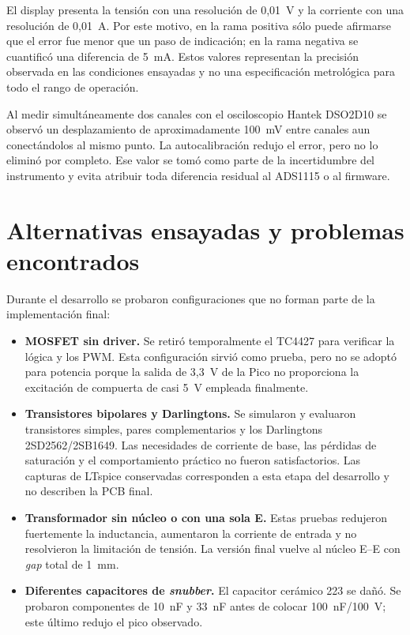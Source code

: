 \documentclass[conference]{IEEEtran}
\begin{document}
El display presenta la tensión con una resolución de 0,01~V y la corriente con una resolución de 0,01~A. Por este motivo, en la rama positiva sólo puede afirmarse que el error fue menor que un paso de indicación; en la rama negativa se cuantificó una diferencia de 5~mA. Estos valores representan la precisión observada en las condiciones ensayadas y no una especificación metrológica para todo el rango de operación.

Al medir simultáneamente dos canales con el osciloscopio Hantek DSO2D10 se observó un desplazamiento de aproximadamente 100~mV entre canales aun conectándolos al mismo punto. La autocalibración redujo el error, pero no lo eliminó por completo. Ese valor se tomó como parte de la incertidumbre del instrumento y evita atribuir toda diferencia residual al ADS1115 o al firmware.

\section{Alternativas ensayadas y problemas encontrados}

Durante el desarrollo se probaron configuraciones que no forman parte de la implementación final:

\begin{itemize}
\item \textbf{MOSFET sin driver.} Se retiró temporalmente el TC4427 para verificar la lógica y los PWM. Esta configuración sirvió como prueba, pero no se adoptó para potencia porque la salida de 3,3~V de la Pico no proporciona la excitación de compuerta de casi 5~V empleada finalmente.
\item \textbf{Transistores bipolares y Darlingtons.} Se simularon y evaluaron transistores simples, pares complementarios y los Darlingtons 2SD2562/2SB1649. Las necesidades de corriente de base, las pérdidas de saturación y el comportamiento práctico no fueron satisfactorios. Las capturas de LTspice conservadas corresponden a esta etapa del desarrollo y no describen la PCB final.
\item \textbf{Transformador sin núcleo o con una sola E.} Estas pruebas redujeron fuertemente la inductancia, aumentaron la corriente de entrada y no resolvieron la limitación de tensión. La versión final vuelve al núcleo E--E con \textit{gap} total de 1~mm.
\item \textbf{Diferentes capacitores de \textit{snubber}.} El capacitor cerámico 223 se dañó. Se probaron componentes de 10~nF y 33~nF antes de colocar 100~nF/100~V; este último redujo el pico observado.
\end{itemize}
\end{document}
